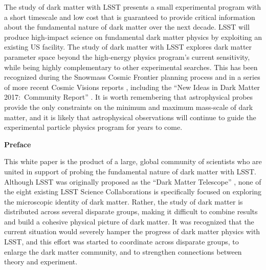 
The study of dark matter with LSST presents a small experimental program with a short timescale and low cost that is guaranteed to provide critical information about the fundamental nature of dark matter over the next decade.
LSST will produce high-impact science on fundamental dark matter physics by exploiting an existing US facility. 
The study of dark matter with LSST explores dark matter parameter space beyond the high-energy physics program's current sensitivity, while being highly complementary to other experimental searches. %
This has been recognized during the Snowmass Cosmic Frontier planning process \citep[\eg,][]{1305.1605, 1310.8642, 1310.5662} and in a series of more recent Cosmic Visions reports \citep[\eg,][]{1604.07626,1802.07216}, including the ``New Ideas in Dark Matter 2017:\ Community Report'' \citep{1707.04591}.
It is worth remembering that astrophysical probes provide the only constraints on the minimum and maximum mass-scale of dark matter, and it is likely that astrophysical observations will continue to guide the  experimental particle physics program for years to come.

\clearpage

\begin{center}
  {\Large \bf Preface}
\end{center}

This white paper is the product of a large, global community of scientists who are united in support of probing the fundamental nature of dark matter with LSST.
Although LSST was originally proposed as the ``Dark Matter Telescope'' \citep{Tyson:2001}, none of the eight existing LSST Science Collaborations is specifically focused on exploring the microscopic identity of dark matter.
Rather, the study of dark matter is distributed across several disparate groups, making it difficult to combine results and build a cohesive physical picture of dark matter.
It was recognized that the current situation would severely hamper the progress of dark matter physics with LSST, and this effort was started to coordinate across disparate groups, to enlarge the dark matter community, and to strengthen connections between theory and experiment.

